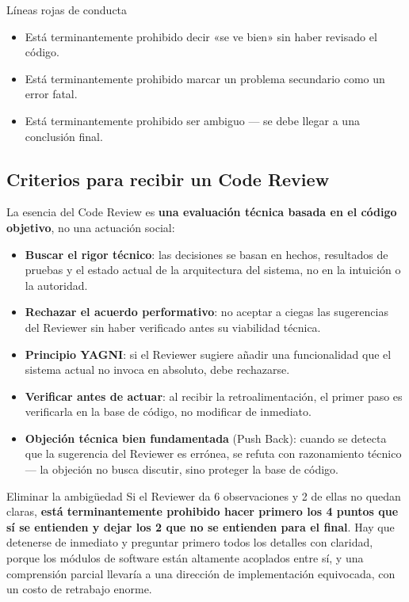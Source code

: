 \documentclass[a4paper]{article}
\begin{document}
\begin{warningbox}{Líneas rojas de conducta}
\begin{itemize}
    \item Está terminantemente prohibido decir «se ve bien» sin haber revisado el código.
    \item Está terminantemente prohibido marcar un problema secundario como un error fatal.
    \item Está terminantemente prohibido ser ambiguo — se debe llegar a una conclusión final.
\end{itemize}
\end{warningbox}

\subsection{Criterios para recibir un Code Review}

La esencia del Code Review es \textbf{una evaluación técnica basada en el código objetivo}, no una actuación social:

\begin{itemize}
    \item \textbf{Buscar el rigor técnico}: las decisiones se basan en hechos, resultados de pruebas y el estado actual de la arquitectura del sistema, no en la intuición o la autoridad.
    \item \textbf{Rechazar el acuerdo performativo}: no aceptar a ciegas las sugerencias del Reviewer sin haber verificado antes su viabilidad técnica.
    \item \textbf{Principio YAGNI}: si el Reviewer sugiere añadir una funcionalidad que el sistema actual no invoca en absoluto, debe rechazarse.
    \item \textbf{Verificar antes de actuar}: al recibir la retroalimentación, el primer paso es verificarla en la base de código, no modificar de inmediato.
    \item \textbf{Objeción técnica bien fundamentada} (Push Back): cuando se detecta que la sugerencia del Reviewer es errónea, se refuta con razonamiento técnico — la objeción no busca discutir, sino proteger la base de código.
\end{itemize}

\begin{knowledgebox}{Eliminar la ambigüedad}
Si el Reviewer da 6 observaciones y 2 de ellas no quedan claras, \textbf{está terminantemente prohibido hacer primero los 4 puntos que sí se entienden y dejar los 2 que no se entienden para el final}. Hay que detenerse de inmediato y preguntar primero todos los detalles con claridad, porque los módulos de software están altamente acoplados entre sí, y una comprensión parcial llevaría a una dirección de implementación equivocada, con un costo de retrabajo enorme.
\end{knowledgebox}
\end{document}
